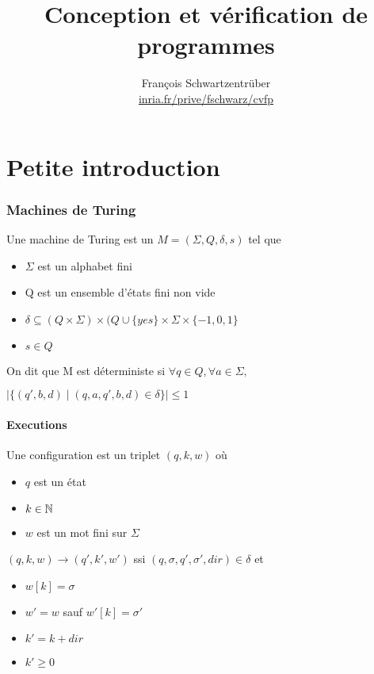 \documentclass[10pt,a4paper]{article}
\title{Conception et vérification de programmes}
\author{François Schwartzentrüber\\
\url{inria.fr/prive/fschwarz/cvfp}}
\date{}
\begin{document}
\renewcommand{\labelitemi}{$\bullet$}

\maketitle

\part{Petite introduction}

\section{Machines de Turing}

\begin{definition} Une machine de Turing est un $M = ( \Sigma , Q , \delta, s)$ tel que \begin{itemize}
\item $\Sigma$ est un alphabet fini
\item Q est un ensemble d'états fini non vide
\item $\delta \subseteq (Q \times \Sigma) \times (Q \cup \{yes \} \times \Sigma \times \{-1, 0, 1\}$
\item $s \in Q$
\end{itemize}
On dit que M est déterministe si $\forall q \in Q, \forall a \in \Sigma,$

$\mid \{ (q', b, d) \mid (q, a, q', b, d) \in \delta \} \mid \leq 1$
\end{definition}

\subsection{Executions}
\begin{definition}[Configuration]
Une configuration est un triplet $(q, k, w)$ où \begin{itemize}
\item $q$ est un état
\item $k \in \mathbb{N}$
\item $w$ est un mot fini sur $\Sigma$
\end{itemize}
\end{definition}

\begin{definition}[Transition]
$(q, k, w) \rightarrow (q', k', w')$ ssi $(q, \sigma, q', \sigma', dir) \in \delta$ et \begin{itemize}
\item $w[k] = \sigma$
\item $w' = w$ sauf $w'[k] = \sigma'$
\item $k' = k + dir$
\item $k' \geq 0$
\end{itemize}\end{definition}
\end{document}
